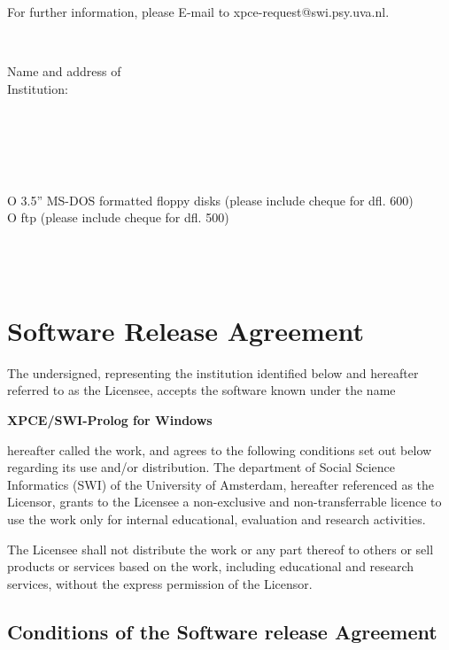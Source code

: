 For further information, please E-mail to xpce-request@swi.psy.uva.nl.

\newlength{\tag}
\settowidth{\tag}{Authorised Signature: }
\newlength{\rest}
\setlength{\rest}{\textwidth}
\addtolength{\rest}{-\tag}

\newcommand{\fillin}{\dotfill\mbox{}}
\newcommand{\onlydots}{\mbox{}\fillin}
\newcommand{\next}{\\[2mm]}

\vspace{0.5cm}
\fillin \next
\parbox[t]{\tag}{Name and address of \\ Institution:}%
\parbox[t]{\rest}{\onlydots \next \onlydots \next \onlydots} \next
{}\fillin \next
{}O 3.5'' MS-DOS formatted floppy disks (please include cheque for dfl. 600) \\
\makebox[\tag][l]{\mbox{}}O ftp (please include cheque for dfl. 500) \next
{}\fillin \next
{}\fillin \next
{}\fillin \\


\section*{Software Release Agreement}

The undersigned, representing the institution identified below and
hereafter referred to as the Licensee, accepts the software known under
the name

\vspace{2mm}
\centerline{\bf XPCE/SWI-Prolog for Windows}
\vspace{2mm}

hereafter called the work, and agrees to the following conditions set
out below regarding its use and/or distribution.  The department of
Social Science Informatics (SWI) of the University of Amsterdam,
hereafter referenced as the Licensor, grants to the Licensee a
non-exclusive and non-transferrable licence to use the work only for
internal educational, evaluation and research activities.

The Licensee shall not distribute the work or any part thereof to others
or sell products or services based on the work, including educational
and research services, without the express permission of the Licensor.

\subsection*{Conditions of the Software release Agreement}

